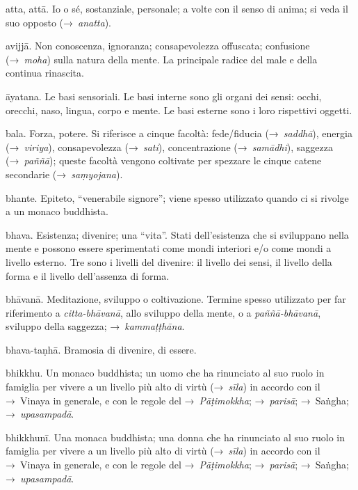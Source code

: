 \begin{glossarydescription}
\item[atta, attā.] Io o sé, sostanziale, personale; a volte con
  il senso di anima; si veda il suo opposto (→~\emph{anatta}).

\item[avijjā.] Non conoscenza, ignoranza; consapevolezza offuscata;
  confusione (→~\emph{moha}) sulla natura della mente. La principale radice del
  male e della continua rinascita.

\item[āyatana.] Le basi sensoriali. Le basi interne sono gli organi dei
  sensi: occhi, orecchi, naso, lingua, corpo e mente. Le basi esterne sono i
  loro rispettivi oggetti.


\item[bala.] Forza, potere. Si riferisce a cinque facoltà: fede/fiducia
  (→~\emph{saddhā}), energia (→~\emph{viriya}), consapevolezza (→~\emph{sati}),
  concentrazione (→~\emph{samādhi}), saggezza (→~\emph{paññā}); queste facoltà
  vengono coltivate per spezzare le cinque catene secondarie
  (→~\emph{saṃyojana}).

\item[bhante.] Epiteto, ``venerabile signore''; viene spesso utilizzato
  quando ci si rivolge a un monaco buddhista.

\item[bhava.] Esistenza; divenire; una ``vita''. Stati dell'esistenza che
  si sviluppano nella mente e possono essere sperimentati come mondi interiori
  e/o come mondi a livello esterno. Tre sono i livelli del divenire: il livello
  dei sensi, il livello della forma e il livello dell'assenza di forma.

\item[bhāvanā.] Meditazione, sviluppo o coltivazione. Termine spesso
  utilizzato per far riferimento a \emph{citta-bhāvanā}, allo sviluppo della
  mente, o a \emph{paññā-bhāvanā}, sviluppo della saggezza;
  →~\emph{kammaṭṭhāna}.

\item[bhava-taṇhā.] Bramosia di divenire, di essere.

\item[bhikkhu.] Un monaco buddhista; un uomo che ha rinunciato al suo
  ruolo in famiglia per vivere a un livello più alto di virtù (→~\emph{sīla}) in
  accordo con il →~Vinaya in generale, e con le regole del →~\emph{Pāṭimokkha};
  →~\emph{parisā}; →~Saṅgha; →~\emph{upasampadā}.

\item[bhikkhunī.] Una monaca buddhista; una donna che ha rinunciato al suo
  ruolo in famiglia per vivere a un livello più alto di virtù (→~\emph{sīla}) in
  accordo con il →~Vinaya in generale, e con le regole del →~\emph{Pāṭimokkha};
  →~\emph{parisā}; →~Saṅgha; →~\emph{upasampadā}.


\end{glossarydescription}
